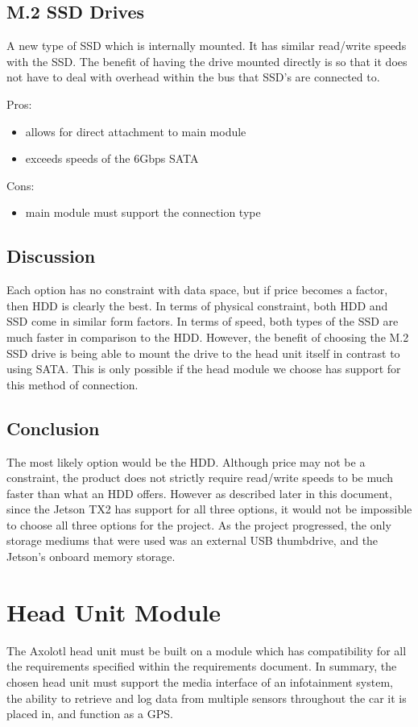 \documentclass[onecolumn, draftclsnofoot,10pt, compsoc]{IEEEtran}
\begin{document}
\subsection{M.2 SSD Drives}
A new type of SSD which is internally mounted. It has similar read/write speeds with the SSD. The benefit of having the drive mounted directly is so that it does not have to deal with overhead within the bus that SSD's are connected to. 
~\cite{m.2:information}
~\cite{m.2:information2}

Pros:
\begin{itemize}
    \item allows for direct attachment to main module
    \item exceeds speeds of the 6Gbps SATA
\end{itemize}

Cons:
\begin{itemize}
    \item main module must support the connection type
\end{itemize}

\subsection{Discussion}
Each option has no constraint with data space, but if price becomes a factor, then HDD is clearly the best.
In terms of physical constraint, both HDD and SSD come in similar form factors.
In terms of speed, both types of the SSD are much faster in comparison to the HDD. 
However, the benefit of choosing the M.2 SSD drive is being able to mount the drive to the head unit itself in contrast to using SATA. This is only possible if the head module we choose has support for this method of connection.

\subsection{Conclusion}
The most likely option would be the HDD. Although price may not be a constraint, the product does not strictly require read/write speeds to be much faster than what an HDD offers. However as described later in this document, since the Jetson TX2 has support for all three options, it would not be impossible to choose all three options for the project. As the project progressed, the only storage mediums that were used was an external USB thumbdrive, and the Jetson's onboard memory storage.

\section{Head Unit Module}
The Axolotl head unit must be built on a module which has compatibility for all the requirements specified within the requirements document. In summary, the chosen head unit must support the media interface of an infotainment system, the ability to retrieve and log data from multiple sensors throughout the car it is placed in, and function as a GPS. 
\end{document}
